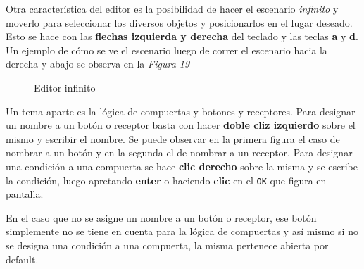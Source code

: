 \documentclass[a4paper]{article}
\begin{document}
\newpage

Otra característica del editor es la posibilidad de hacer el escenario \textit{infinito} y moverlo para seleccionar los diversos objetos y posicionarlos en el lugar deseado. Esto se hace con las \textbf{flechas izquierda y derecha} del teclado y las teclas \textbf{a} y \textbf{d}. Un ejemplo de cómo se ve el escenario luego de correr el escenario hacia la derecha y abajo se observa en la \textit{Figura 19}

\begin{figure}[!h]
	\caption{Editor infinito}
	\label{fig:diagrama19}
\end{figure}

\newpage

Un tema aparte es la lógica de compuertas y botones y receptores. Para designar un nombre a un botón o receptor basta con hacer \textbf{doble cliz izquierdo} sobre el mismo y escribir el nombre. Se puede observar en la primera figura el caso de nombrar a un botón y en la segunda el de nombrar a un receptor. Para designar una condición a una compuerta se hace \textbf{clic derecho} sobre la misma y se escribe la condición, luego apretando \textbf{enter} o haciendo \textbf{clic} en el \texttt{OK} que figura en pantalla.

En el caso que no se asigne un nombre a un botón o receptor, ese botón simplemente no se tiene en cuenta para la lógica de compuertas y así mismo si no se designa una condición a una compuerta, la misma pertenece abierta por default.
\end{document}
